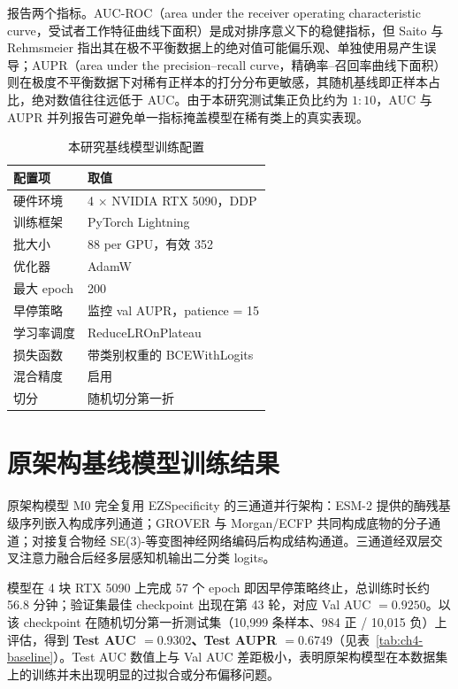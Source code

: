 报告两个指标。AUC-ROC（area under the receiver operating characteristic curve，受试者工作特征曲线下面积）是成对排序意义下的稳健指标，但 Saito 与 Rehmsmeier 指出其在极不平衡数据上的绝对值可能偏乐观、单独使用易产生误导\cite{Saito2015}；AUPR（area under the precision--recall curve，精确率--召回率曲线下面积）则在极度不平衡数据下对稀有正样本的打分分布更敏感，其随机基线即正样本占比，绝对数值往往远低于 AUC。由于本研究测试集正负比约为 $1:10$，AUC 与 AUPR 并列报告可避免单一指标掩盖模型在稀有类上的真实表现。

\begin{table}[htbp]
  \centering
  \caption{本研究基线模型训练配置}
  \label{tab:ch4-config}
  \begin{tabular}{ll}
    \toprule
    配置项 & 取值 \\
    \midrule
    硬件环境     & 4 $\times$ NVIDIA RTX 5090，DDP \\
    训练框架     & PyTorch Lightning \\
    批大小       & 88 per GPU，有效 352 \\
    优化器       & AdamW \\
    最大 epoch   & 200 \\
    早停策略     & 监控 val AUPR，patience = 15 \\
    学习率调度   & ReduceLROnPlateau \\
    损失函数     & 带类别权重的 BCEWithLogits \\
    混合精度     & 启用 \\
    切分         & 随机切分第一折 \\
    \bottomrule
  \end{tabular}
\end{table}

\section{原架构基线模型训练结果}
\label{sec:ch4-baseline}

原架构模型 M0 完全复用 EZSpecificity\cite{EZSpec2025} 的三通道并行架构：ESM-2\cite{ESM2023} 提供的酶残基级序列嵌入构成序列通道；GROVER\cite{GROVER2020} 与 Morgan/ECFP\cite{ECFP2010} 共同构成底物的分子通道；对接复合物经 SE(3)-等变图神经网络编码后构成结构通道。三通道经双层交叉注意力融合后经多层感知机输出二分类 logits。

模型在 4 块 RTX 5090 上完成 57 个 epoch 即因早停策略终止，总训练时长约 56.8 分钟；验证集最佳 checkpoint 出现在第 43 轮，对应 Val AUC $= 0.9250$。以该 checkpoint 在随机切分第一折测试集（10{,}999 条样本、984 正 / 10{,}015 负）上评估，得到 \textbf{Test AUC $= 0.9302$、Test AUPR $= 0.6749$}（见表~\ref{tab:ch4-baseline}）。Test AUC 数值上与 Val AUC 差距极小，表明原架构模型在本数据集上的训练并未出现明显的过拟合或分布偏移问题。

